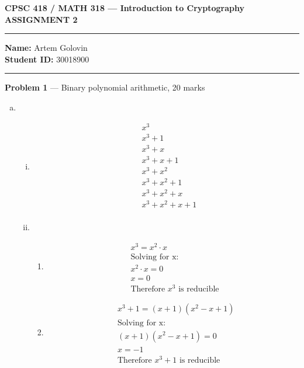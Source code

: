 \documentclass[11pt]{article}
\theoremstyle{definition}
\begin{document}
\begin{center}

  \bf \Large CPSC 418 / MATH 318 --- Introduction to Cryptography \\
  ASSIGNMENT 2

\end{center}


\medskip \hrule
  \textbf{Name:} Artem Golovin \\
  \textbf{Student ID:} 30018900
\medskip \hrule

\item[] \textbf{Problem 1} --- Binary polynomial arithmetic, 20 marks

\begin{enumerate}[a.]

  \item
    \begin{enumerate}[i. ]
      \item
        \begin{align*}
          &x^3 \\
          &x^3 + 1  \\
          &x^3 + x \\
          &x^3 + x + 1 \\
          &x^3 + x^2 \\
          &x^3 + x^2 + 1 \\
          &x^3 + x^2 + x \\
          &x^3 + x^2 + x + 1 \\
        \end{align*}

      \item
        \begin{enumerate}[1. ]
          \item
            \begin{align*}
              & x^3 = x^2 \cdot x \\
              & \text{Solving for x: } \\
              & x^2 \cdot x = 0 \\
              & x = 0 \\
              & \text{Therefore } x^3 \text{ is reducible }
            \end{align*}

          \item
            \begin{align*}
              & x^3 + 1 = (x + 1)(x^2 - x + 1) \\
              & \text{Solving for x: } \\
              & (x + 1)(x^2 - x + 1) = 0 \\
              & x = -1 \\
              & \text{Therefore } x^3 + 1 \text{ is reducible }
            \end{align*}


\end{enumerate}
\end{enumerate}
\end{enumerate}
\end{document}
